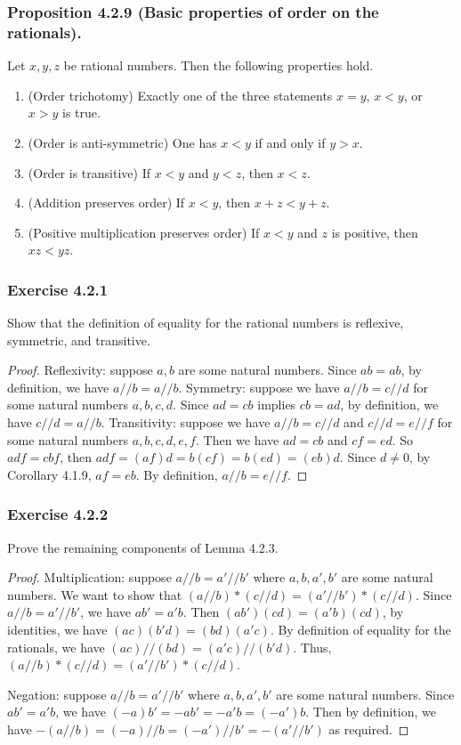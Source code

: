 \documentclass[12pt, letter]{article}
\begin{document}
\subsubsection*{Proposition 4.2.9 (Basic properties of order on the rationals).}
Let $x,y,z$ be rational numbers. Then the following properties hold.
\begin{enumerate}[label=(\alph*)]
    \item (Order trichotomy) Exactly one of the three statements $x=y$, $x<y$, or $x>y$ is true.
    \item (Order is anti-symmetric) One has $x<y$ if and only if $y>x$.
    \item (Order is transitive) If $x<y$ and $y<z$, then $x<z$.
    \item (Addition preserves order) If $x<y$, then $x+z<y+z$.
    \item (Positive multiplication preserves order) If $x<y$ and $z$ is positive, then $xz<yz$. 
\end{enumerate}
\subsubsection*{Exercise 4.2.1}
Show that the definition of equality for the rational numbers is reflexive, symmetric, and transitive.
\begin{proof}
    Reflexivity: suppose $a,b$ are some natural numbers. Since $ab=ab$, by definition, we have $a//b=a//b$.
    Symmetry: suppose we have $a//b=c//d$ for some natural numbers $a,b,c,d$. Since $ad=cb$ implies $cb=ad$, by definition, we have $c//d=a//b$.
    Transitivity: suppose we have $a//b=c//d$ and $c//d=e//f$ for some natural numbers $a,b,c,d,e,f$. Then we have $ad=cb$ and $cf=ed$. So $adf=cbf$, then $adf=(af)d=b(cf)=b(ed)=(eb)d$.
    Since $d\ne 0$, by Corollary 4.1.9, $af=eb$. By definition, $a//b=e//f$.
\end{proof}
\subsubsection*{Exercise 4.2.2}
Prove the remaining components of Lemma 4.2.3.
\begin{proof}
    Multiplication: suppose $a//b=a'//b'$ where $a,b,a',b'$ are some natural numbers. We want to show that $(a//b)*(c//d)=(a'//b')*(c//d)$. Since 
    $a//b=a'//b'$, we have $ab'=a'b$. Then $(ab')(cd)=(a'b)(cd)$, by identities, we have $(ac)(b'd)=(bd)(a'c)$. By definition of equality for the rationals, we have $(ac)//(bd)=(a'c)//(b'd)$.
    Thus, $(a//b)*(c//d)=(a'//b')*(c//d)$.

    Negation: suppose $a//b=a'//b'$ where $a,b,a',b'$ are some natural numbers. Since $ab'=a'b$, we have $(-a)b'=-ab'=-a'b=(-a')b$. Then by definition, we have 
    $-(a//b)=(-a)//b=(-a')//b'=-(a'//b')$ as required.
\end{proof}
\end{document}
